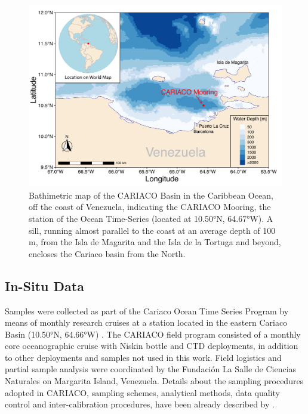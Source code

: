 \documentclass[draft]{agujournal2019}
\begin{document}
\begin{figure}
\noindent\includegraphics[width=\textwidth]{fig/Map_CAR.pdf}
\caption{Bathimetric map of the CARIACO Basin in the Caribbean Ocean, off the coast of Venezuela, indicating the CARIACO Mooring, the station of the Ocean Time-Series (located at \ang{10.50}N, \ang{64.67}W). A sill, running almost parallel to the coast at an average depth of 100\,m, from the Isla de Magarita and the Isla de la Tortuga and beyond, encloses the Cariaco basin from the North.}
\label{fig:map}
\end{figure}


\subsection{In-Situ Data}
    Samples were collected as part of the Cariaco Ocean Time Series Program by means of monthly research cruises at a station located in the eastern Cariaco Basin (\ang{10.50}N, \ang{64.66}W) \cite{muller-karger_scientific_2019}.
    The CARIACO field program consisted of a monthly core oceanographic cruise with Niskin bottle and CTD deployments, in addition to other deployments and samples not used in this work. Field logistics and partial sample analysis were coordinated by the Fundación La Salle de Ciencias Naturales on Margarita Island, Venezuela. Details about the sampling procedures adopted in CARIACO, sampling schemes, analytical methods,  data quality control and inter-calibration procedures, have been already described by . 
    
\end{document}
